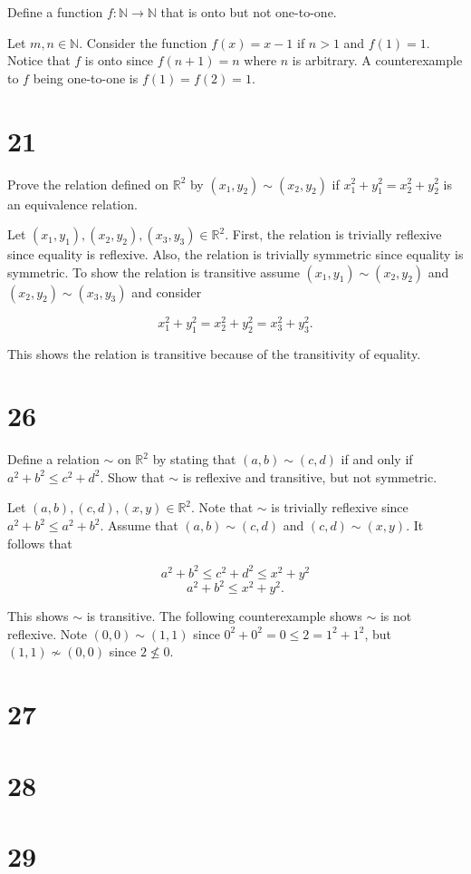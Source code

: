 \documentclass[a4paper]{article}
\begin{document}
\vspace{\baselineskip}

Define a function $f: \mathbb{N} \rightarrow \mathbb{N}$ that is onto but not one-to-one.

\vspace{\baselineskip}

Let $m,n \in \mathbb{N}$. Consider the function $f(x) = x - 1$ if $n > 1$ and $f(1) = 1$. Notice that $f$ is onto since $f(n+1) = n$ where $n$ is arbitrary. A counterexample to $f$ being one-to-one is $f(1) = f(2) = 1$.


\section*{21}

Prove the relation defined on $\mathbb{R}^2$ by $(x_1, y_2) \sim (x_2, y_2)$ if $x_1^2 + y_1^2 = x_2^2 + y_2^2$ is an equivalence relation.

\vspace{\baselineskip}

Let $(x_1, y_1), (x_2, y_2), (x_3, y_3) \in \mathbb{R}^2$. First, the relation is trivially reflexive since equality is reflexive. Also, the relation is trivially symmetric since equality is symmetric. To show the relation is transitive assume $(x_1, y_1) \sim (x_2, y_2)$ and $(x_2, y_2) \sim (x_3, y_3)$ and consider

$$x_1^2 + y_1 ^2 = x_2^2 + y_2^2 = x_3^2 + y_3^2.$$

This shows the relation is transitive because of the transitivity of equality.


\section*{26}

Define a relation $\sim$ on $\mathbb{R}^2$ by stating that $(a,b) \sim (c,d)$ if and only if $a^2 + b^2 \leq c^2 + d^2$. Show that $\sim$ is reflexive and transitive, but not symmetric.

\vspace{\baselineskip}

Let $(a,b), (c,d), (x,y) \in \mathbb{R}^2$. Note that $\sim$ is trivially reflexive since $a^2 + b^2 \leq a^2 + b^2$. Assume that $(a,b) \sim (c,d)$ and $(c,d) \sim (x,y)$. It follows that 

$$a^2 + b^2 \leq c^2 + d^2 \leq x^2 + y^2$$
$$a^2 + b^2 \leq x^2 + y^2.$$

This shows $\sim$ is transitive. The following counterexample shows $\sim$ is not reflexive. Note $(0,0) \sim (1,1)$ since $0^2 + 0^2 = 0 \leq 2 = 1^2 + 1^2$, but $(1,1) \not \sim (0,0)$ since $2 \not \leq 0$.

\section*{27}
\section*{28}
\section*{29}
\end{document}
